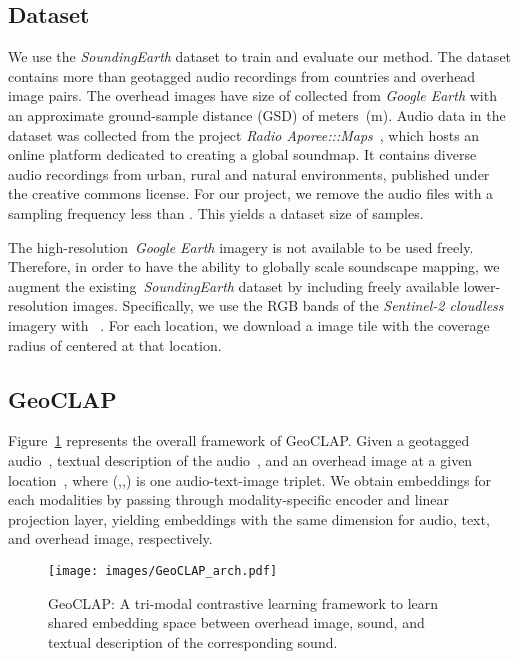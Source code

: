 \documentclass{bmvc2k}
\begin{document}
\subsection{Dataset}
\label{sec:dataset}

We use the {\em SoundingEarth} dataset to train and evaluate our method. The dataset contains more than  geotagged audio recordings from  countries and overhead image pairs. The overhead images have size of   collected from {\em Google Earth} with an approximate ground-sample distance (GSD) of  meters~(m). Audio data in the dataset was collected from the project {\em Radio Aporee:::Maps}~\cite{aporee}, which hosts an online platform dedicated to creating a global soundmap. It contains diverse audio recordings from urban, rural and natural environments, published under the creative commons license. For our project, we remove the audio files with a sampling frequency less than . This yields a dataset size of  samples. 

The high-resolution~{\em Google Earth} imagery is not available to be used freely. Therefore, in order to have the ability to globally scale soundscape mapping, we augment the existing~{\em SoundingEarth} dataset by including freely available lower-resolution images. Specifically, we use the RGB bands of the \textit{Sentinel-2 cloudless} imagery with ~. For each location, we download a  image tile with the coverage radius of  centered at that location.

\subsection{GeoCLAP}

Figure~\ref{fig:geoclap} represents the overall framework of GeoCLAP. Given a geotagged audio~, textual description of the audio~, and an overhead image at a given location~, where (,,) is one audio-text-image triplet. We obtain embeddings for each modalities by passing through modality-specific encoder and linear projection layer, yielding embeddings with the same dimension for audio, text, and overhead image, respectively.
\begin{figure}[!ht]
    \centering
    \texttt{[image: images/GeoCLAP\_arch.pdf]}
    \caption{GeoCLAP: A tri-modal contrastive learning framework to learn shared embedding space between overhead image, sound, and textual description of the corresponding sound.}
    \label{fig:geoclap}
\end{figure}
\end{document}
